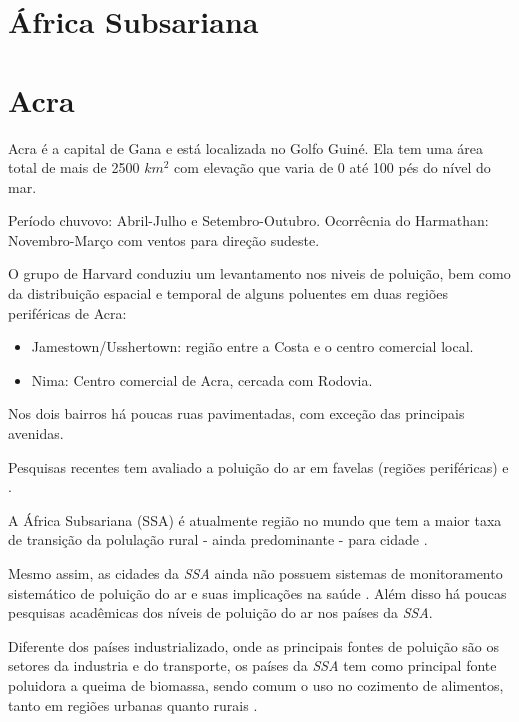 \section{África Subsariana}

\section{Acra}

Acra é a capital  de Gana e está localizada no Golfo Guiné. Ela tem uma área 
total de mais de 2500 $km^2$ com elevação que varia de 0 até 100 pés do nível 
do mar. 

Período chuvovo: Abril-Julho e Setembro-Outubro. 
Ocorrêcnia do Harmathan: Novembro-Março com ventos para direção sudeste.

O grupo de Harvard \citep{ARKU2008} conduziu um levantamento nos niveis de 
poluição, bem como da distribuição espacial e temporal de alguns poluentes 
em duas regiões periféricas de Acra: 
\citep{DIONISIO2010}

\begin{itemize}
  \item Jamestown/Usshertown: região entre a Costa e o centro comercial local.
  \item Nima: Centro comercial de Acra, cercada com Rodovia.
\end{itemize} 

Nos dois bairros há poucas ruas pavimentadas, com exceção das principais 
avenidas. 

Pesquisas recentes tem avaliado a poluição do ar em favelas 
(regiões periféricas) \citep{SCLAR2005} e \citep{RILEY2007}. 

A África Subsariana (SSA) é atualmente região no mundo que tem a maior taxa de 
transição da polulação rural - ainda predominante - para cidade 
\citep{MONTGOMERY2008}.

Mesmo assim, as cidades da \textit{SSA} ainda não possuem sistemas de 
monitoramento sistemático de poluição do ar e suas implicações na saúde 
\citep{EZZATI2004}. 
Além disso há poucas pesquisas acadêmicas dos níveis de poluição do ar nos 
países da \textit{SSA}.

Diferente dos países industrializado, onde as principais fontes de poluição 
são os setores da industria e do transporte, os países da \textit{SSA} tem como 
principal fonte poluidora a queima de biomassa, sendo comum o uso no cozimento 
de alimentos, tanto em regiões urbanas quanto rurais \citep{SMITH2004}.
